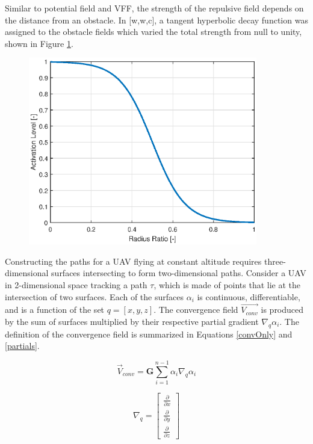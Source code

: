 \documentclass[numbered,pdftex]{ohio-etd}
\begin{document}
Similar to potential field and VFF, the strength of the repulsive field depends on the distance from an obstacle. In [w,w,c], a tangent hyperbolic decay function was assigned to the obstacle fields which varied the total strength from null to unity, shown in Figure \ref{fig:tanhICUAS2018}. 

\begin{figure}
	\centering
	\includegraphics[width=10cm]{PaperFigures/tanh_ICUAS2018}
	\caption{}
	\label{fig:tanhICUAS2018}
\end{figure}



Constructing the paths for a UAV flying at constant altitude requires three-dimensional surfaces intersecting to form two-dimensional paths. Consider a UAV in 2-dimensional space tracking a path $\tau$, which is made of points that lie at the intersection of two surfaces. Each of the surfaces $\alpha_i$ is continuous, differentiable, and is a function of the set $q = [x,y,z]$. The convergence field $\vec{V_{conv}}$ is produced by the sum of surfaces multiplied by their respective partial gradient $\nabla_q\alpha_i$. The definition of the convergence field is summarized in Equations \ref{convOnly} and \ref{partials}.



\begin{equation}
\vec{V}_{conv} = \boldsymbol{G}\sum_{i=1}^{n-1}\alpha_i\nabla_q\alpha_i  
\label{convOnly}
\end{equation}

\begin{equation}
\label{partials}
\nabla_q=\begin{bmatrix}
\frac{\partial}{\partial x} \\
\frac{\partial}{\partial y} \\
\frac{\partial}{\partial z}
\end{bmatrix}
\end{equation}
\end{document}
